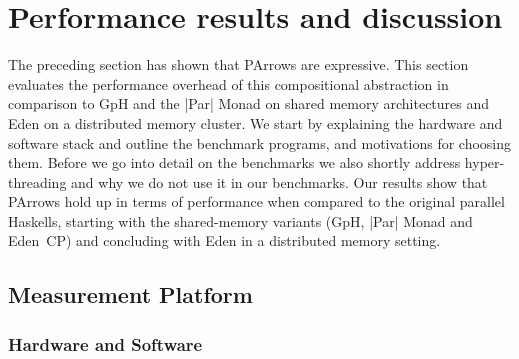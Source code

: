 
%
\section{Performance results and discussion}
\label{sec:benchmarks}

The preceding section has shown that PArrows are expressive. This section evaluates the performance overhead of this compositional abstraction in comparison to  GpH and the |Par| Monad on shared memory architectures and Eden on  a distributed memory cluster.
We start by explaining the hardware and software stack and outline the benchmark programs, and motivations for choosing them. Before we go into detail on the benchmarks we
also shortly address hyper-threading and why we do not use it in our
benchmarks. Our results show that PArrows hold up in terms of performance when compared to the original parallel Haskells, starting with the shared-memory variants (GpH, |Par| Monad and Eden~CP) and concluding with Eden in a distributed memory setting.


\newcommand{\rmtest}{Rabin--Miller test\xspace}
\newcommand{\sudokutest}{Sudoku\xspace}
\newcommand{\jacobitest}{Jacobi sum test\xspace}
\newcommand{\torustest}{Gentleman\xspace}
\newlength{\plotwidthSMP}
\setlength{\plotwidthSMP}{0.39\textwidth}
\newlength{\plotwidthDist}
\setlength{\plotwidthDist}{0.6\textwidth}

\newcommand{\benchmarkDir}{benchmarks}

\newcommand{\speedupplot}[8]{
\begin{tikzpicture}
\begin{axis}[title={#1},
title style={align=center},
scale only axis, width=#7,
xlabel=Threads,
xtick distance=#4,
ytick distance=#4,
ylabel=Speedup,
ylabel near ticks,
grid=major,
legend entries={linear, #2},
legend style={at={(0.01,0.99)},anchor=north west},
max space between ticks=50pt,
grid style={line width=.1pt, draw=gray!10},
major grid style={line width=.2pt,draw=gray!50},
ymin=-1,
xmin=-1,
ymax=#8,
xmax=#6]
\addplot [domain=0:#3, no markers,dotted,thick]{x};
#5
\end{axis}
\end{tikzpicture}
}

\subsection{Measurement Platform}

\subsubsection{Hardware and Software}

